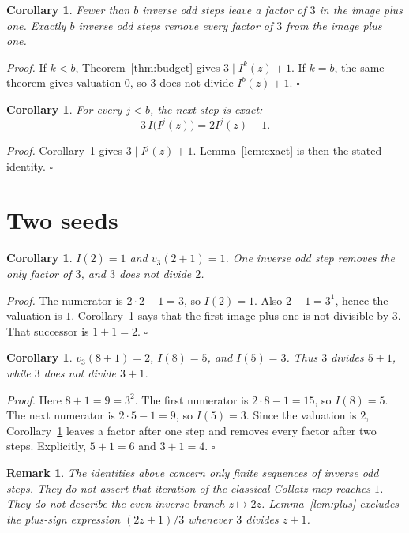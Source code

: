 \documentclass[11pt,letterpaper]{article}
\newtheorem{corollary}[theorem]{Corollary}
\newtheorem{remark}[theorem]{Remark}
\newenvironment{proof}{\noindent\textit{Proof.}}{\hfill\(\square\)}
\begin{document}
\begin{corollary}
\label{cor:budget}
Fewer than \(b\) inverse odd steps leave a factor of \(3\) in the image plus one. Exactly \(b\) inverse odd steps remove every factor of \(3\) from the image plus one.
\end{corollary}

\begin{proof}
If \(k<b\), Theorem~\ref{thm:budget} gives \(3\mid I^k(z)+1\). If \(k=b\), the same theorem gives valuation \(0\), so \(3\) does not divide \(I^b(z)+1\).
\end{proof}

\begin{corollary}
\label{cor:exact}
For every \(j<b\), the next step is exact:
\[
3\,I\bigl(I^j(z)\bigr)=2I^j(z)-1.
\]
\end{corollary}

\begin{proof}
Corollary~\ref{cor:budget} gives \(3\mid I^j(z)+1\). Lemma~\ref{lem:exact} is then the stated identity.
\end{proof}

\section{Two seeds}

\begin{corollary}
\label{cor:two}
\(I(2)=1\) and \(v_3(2+1)=1\). One inverse odd step removes the only factor of \(3\), and \(3\) does not divide \(2\).
\end{corollary}

\begin{proof}
The numerator is \(2\cdot 2-1=3\), so \(I(2)=1\). Also \(2+1=3^1\), hence the valuation is \(1\). Corollary~\ref{cor:budget} says that the first image plus one is not divisible by \(3\). That successor is \(1+1=2\).
\end{proof}

\begin{corollary}
\label{cor:eight}
\(v_3(8+1)=2\), \(I(8)=5\), and \(I(5)=3\). Thus \(3\) divides \(5+1\), while \(3\) does not divide \(3+1\).
\end{corollary}

\begin{proof}
Here \(8+1=9=3^2\). The first numerator is \(2\cdot 8-1=15\), so \(I(8)=5\). The next numerator is \(2\cdot 5-1=9\), so \(I(5)=3\). Since the valuation is \(2\), Corollary~\ref{cor:budget} leaves a factor after one step and removes every factor after two steps. Explicitly, \(5+1=6\) and \(3+1=4\).
\end{proof}

\begin{remark}
The identities above concern only finite sequences of inverse odd steps. They do not assert that iteration of the classical Collatz map reaches \(1\). They do not describe the even inverse branch \(z\mapsto 2z\). Lemma~\ref{lem:plus} excludes the plus-sign expression \((2z+1)/3\) whenever \(3\) divides \(z+1\).
\end{remark}
\end{document}
